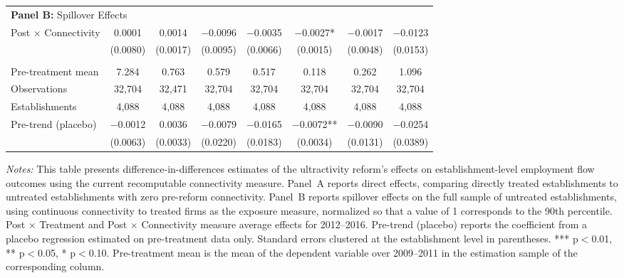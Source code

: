 \begin{table}[H]
\begin{tabular}{lccccccc}
 &  &  &  &  &  &  & \\
\midrule
\multicolumn{8}{l}{\textbf{Panel B:} Spillover Effects} \\
Post $\times$ Connectivity & 0.0001 & 0.0014 & $-$0.0096 & $-$0.0035 & $-$0.0027* & $-$0.0017 & $-$0.0123\\
 & (0.0080) & (0.0017) & (0.0095) & (0.0066) & (0.0015) & (0.0048) & (0.0153)\\
 &  &  &  &  &  &  & \\
Pre-treatment mean & 7.284 & 0.763 & 0.579 & 0.517 & 0.118 & 0.262 & 1.096\\
Observations & 32{,}704 & 32{,}471 & 32{,}704 & 32{,}704 & 32{,}704 & 32{,}704 & 32{,}704\\
Establishments & 4{,}088 & 4{,}088 & 4{,}088 & 4{,}088 & 4{,}088 & 4{,}088 & 4{,}088\\
\midrule
Pre-trend (placebo) & $-$0.0012 & 0.0036 & $-$0.0079 & $-$0.0165 & $-$0.0072** & $-$0.0090 & $-$0.0254\\
 & (0.0063) & (0.0033) & (0.0220) & (0.0183) & (0.0034) & (0.0131) & (0.0389)\\
\bottomrule\bottomrule
\end{tabular}
\begin{minipage}{\linewidth}\vspace{4pt}
\scriptsize\textit{Notes:} This table presents difference-in-differences estimates of the ultractivity reform's effects on establishment-level employment flow outcomes using the current recomputable connectivity measure. Panel~A reports direct effects, comparing directly treated establishments to untreated establishments with zero pre-reform connectivity. Panel~B reports spillover effects on the full sample of untreated establishments, using continuous connectivity to treated firms as the exposure measure, normalized so that a value of 1 corresponds to the 90th percentile. Post $\times$ Treatment and Post $\times$ Connectivity measure average effects for 2012--2016. Pre-trend (placebo) reports the coefficient from a placebo regression estimated on pre-treatment data only. Standard errors clustered at the establishment level in parentheses. *** p$<$0.01, ** p$<$0.05, * p$<$0.10. Pre-treatment mean is the mean of the dependent variable over 2009--2011 in the estimation sample of the corresponding column.
\end{minipage}
\end{table}
